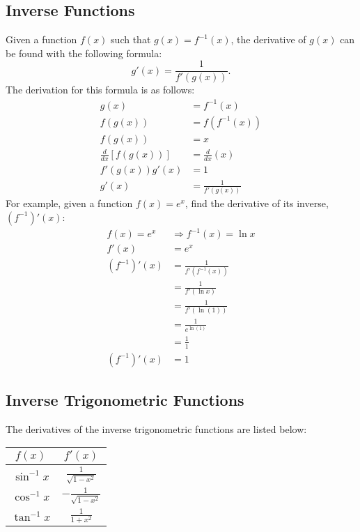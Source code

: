 \subsection{Inverse Functions}
Given a function $f(x)$ such that $g(x) = f^{-1}(x)$, the derivative of $g(x)$ can be found with the following formula:
\[ g'(x) = \frac{1}{f'(g(x))}. \]
The derivation for this formula is as follows:
\begin{align*}
	g(x) &= f^{-1}(x) \\
	f(g(x)) &= f(f^{-1}(x)) \\
	f(g(x)) &= x \\
	\frac{d}{dx} \left[ f(g(x)) \right] &= \frac{d}{dx} (x) \\[5pt]
	f'(g(x)) g'(x) &= 1 \\
	g'(x) &= \frac{1}{f'(g(x))}
\end{align*}
For example, given a function $f(x) = e^x$, find the derivative of its inverse, $(f^{-1})'(x)$:
\begin{align*}
	f(x) = e^x &\Rightarrow f^{-1}(x) = \ln{x} \\
	f'(x) &= e^x \\
	(f^{-1})'(x) &= \frac{1}{f' \left( f^{-1}(x) \right)} \\[5pt]
	&= \frac{1}{f'(\ln{x})} \\[5pt]
	&= \frac{1}{f'(\ln{(1)})} \\[5pt]
	&= \frac{1}{e^{\ln{(1)}}} \\[5pt]
	&= \frac{1}{1} \\[5pt]
	(f^{-1})'(x) &= 1
\end{align*}

\subsection{Inverse Trigonometric Functions}
The derivatives of the inverse trigonometric functions are listed below:
\begin{center}
	\begin{tabular}{|c|c|}
		\hline
		$f(x)$ & $f'(x)$ \\
		\hline \hline
		$\sin^{-1} x$ & $\frac{1}{\sqrt{1-x^2}}$ \\
		\hline
		$\cos^{-1} x$ & $-\frac{1}{\sqrt{1-x^2}}$ \\
		\hline
		$\tan^{-1} x$ & $\frac{1}{1+x^2}$ \\
		\hline
	\end{tabular}
\end{center}

